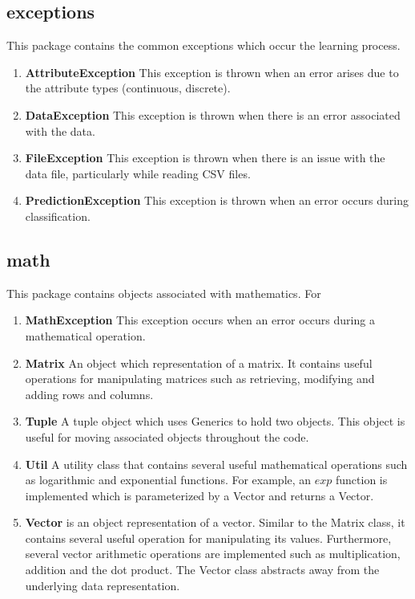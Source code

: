 \documentclass[11pt]{article}
\newcommand{\bb}{\textbf}
\begin{document}
\subsection{exceptions}
This package contains the common exceptions which occur the learning process.

\begin{enumerate}[leftmargin=*]
  \item[] \bb{AttributeException} This exception is thrown when an error arises due to the attribute types (continuous, discrete).
  \item[] \bb{DataException} This exception is thrown when there is an error associated with the data.
  \item[] \bb{FileException} This exception is thrown when there is an issue with the data file, particularly while reading CSV files.
  \item[] \bb{PredictionException} This exception is thrown when an error occurs during classification.
\end{enumerate}

\subsection{math}
This package contains objects associated with mathematics. For

\begin{enumerate}[leftmargin=*]
  \item[] \bb{MathException} This exception occurs when an error occurs during a mathematical operation.
  \item[] \bb{Matrix} An object which representation of a matrix. It contains useful operations for manipulating matrices such as retrieving, modifying and adding rows and columns.
  \item[] \bb{Tuple} A tuple object which uses Generics to hold two objects. This object is useful for moving associated objects throughout the code.
  \item[] \bb{Util} A utility class that contains several useful mathematical operations such as logarithmic and exponential functions. For example, an $exp$ function is implemented which is parameterized by a Vector and returns a Vector.
  \item[] \bb{Vector} is an object representation of a vector. Similar to the Matrix class, it contains several useful operation for manipulating its values. Furthermore, several vector arithmetic operations are implemented such as multiplication, addition and the dot product. The Vector class abstracts away from the underlying data representation.
\end{enumerate}
\end{document}
